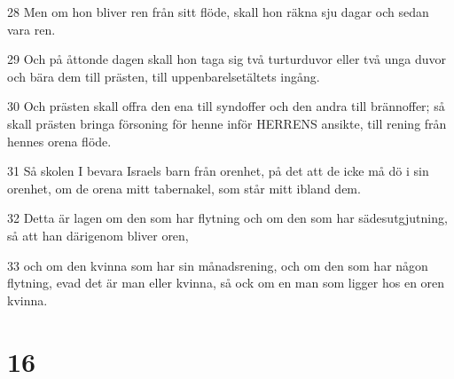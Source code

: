 \par 28 Men om hon bliver ren från sitt flöde, skall hon räkna sju dagar och sedan vara ren.
\par 29 Och på åttonde dagen skall hon taga sig två turturduvor eller två unga duvor och bära dem till prästen, till uppenbarelsetältets ingång.
\par 30 Och prästen skall offra den ena till syndoffer och den andra till brännoffer; så skall prästen bringa försoning för henne inför HERRENS ansikte, till rening från hennes orena flöde.
\par 31 Så skolen I bevara Israels barn från orenhet, på det att de icke må dö i sin orenhet, om de orena mitt tabernakel, som står mitt ibland dem.
\par 32 Detta är lagen om den som har flytning och om den som har sädesutgjutning, så att han därigenom bliver oren,
\par 33 och om den kvinna som har sin månadsrening, och om den som har någon flytning, evad det är man eller kvinna, så ock om en man som ligger hos en oren kvinna.

\chapter{16}

